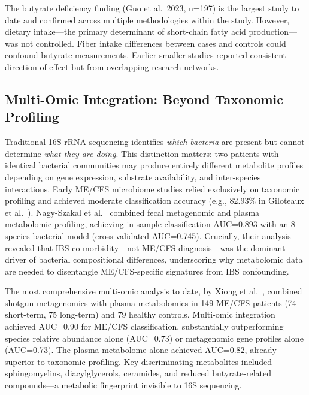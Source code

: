 \begin{warning}
The butyrate deficiency finding (Guo et al.\ 2023, n=197) is the largest study to date and confirmed across multiple methodologies within the study. However, dietary intake---the primary determinant of short-chain fatty acid production---was not controlled. Fiber intake differences between cases and controls could confound butyrate measurements. Earlier smaller studies reported consistent direction of effect but from overlapping research networks.
\end{warning}

\subsection{Multi-Omic Integration: Beyond Taxonomic Profiling}
\label{sec:multi-omic-microbiome}

Traditional 16S rRNA sequencing identifies \textit{which bacteria} are present but cannot determine \textit{what they are doing}. This distinction matters: two patients with identical bacterial communities may produce entirely different metabolite profiles depending on gene expression, substrate availability, and inter-species interactions. Early ME/CFS microbiome studies relied exclusively on taxonomic profiling and achieved moderate classification accuracy (e.g., 82.93\% in Giloteaux et al.~\cite{Giloteaux2016}). Nagy-Szakal et al.~\cite{NagySzakal2017} combined fecal metagenomic and plasma metabolomic profiling, achieving in-sample classification AUC=0.893 with an 8-species bacterial model (cross-validated AUC=0.745). Crucially, their analysis revealed that IBS co-morbidity---not ME/CFS diagnosis---was the dominant driver of bacterial compositional differences, underscoring why metabolomic data are needed to disentangle ME/CFS-specific signatures from IBS confounding.

The most comprehensive multi-omic analysis to date, by Xiong et al.~\cite{Xiong2023multiomics}, combined shotgun metagenomics with plasma metabolomics in 149 ME/CFS patients (74 short-term, 75 long-term) and 79 healthy controls. Multi-omic integration achieved AUC=0.90 for ME/CFS classification, substantially outperforming species relative abundance alone (AUC=0.73) or metagenomic gene profiles alone (AUC=0.73). The plasma metabolome alone achieved AUC=0.82, already superior to taxonomic profiling. Key discriminating metabolites included sphingomyelins, diacylglycerols, ceramides, and reduced butyrate-related compounds---a metabolic fingerprint invisible to 16S sequencing.

